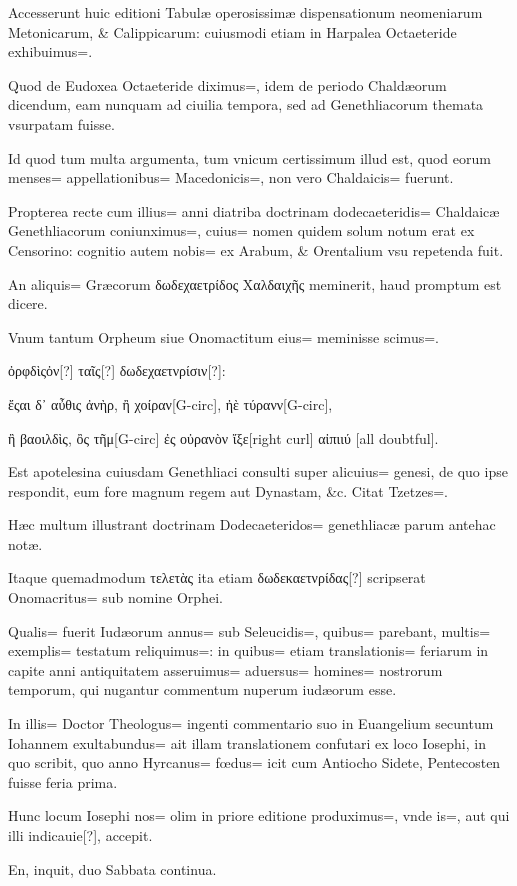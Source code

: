 \begin{parnumbers}
Accesserunt huic editioni Tabulæ operosissimæ dispensationum neomeniarum Metonicarum, \& Calippicarum: cuiusmodi etiam in Harpalea Octaeteride exhibuimus=. 

Quod de Eudoxea Octaeteride diximus=, idem de periodo Chaldæorum dicendum, eam nunquam ad ciuilia tempora, sed ad Genethliacorum themata vsurpatam fuisse.

Id quod tum multa argumenta, tum vnicum certissimum illud est, quod eorum menses= appellationibus= Macedonicis=, non vero Chaldaicis= fuerunt.

Propterea recte cum illius= anni diatriba doctrinam dodecaeteridis= Chaldaicæ Genethliacorum coniunximus=, cuius= nomen quidem solum notum erat ex Censorino: cognitio autem nobis= ex Arabum, \& Orentalium vsu repetenda fuit.

An aliquis= Græcorum δωδεχαετρίδος Χαλδαιχῆς meminerit, haud promptum est dicere.

Vnum tantum Orpheum siue Onomactitum eius= meminisse scimus=. 

ὀρφδὶςὀν[?] ταῖς[?] δωδεχαετνρίσιν[?]:

ἔςαι δ᾽ αὖθις ἀνὴρ, ἢ χοίραν[G-circ], ἠὲ τύρανν[G-circ],

ἢ βαοιλδὶς, ὂς τῆμ[G-circ] ἐς οὐρανὸν ἴξε[right curl] αἰπιιύ [all doubtful].

Est apotelesina cuiusdam Genethliaci consulti super alicuius= genesi, de quo ipse respondit, eum fore magnum regem aut Dynastam, \&c. Citat Tzetzes=. 

Hæc multum illustrant doctrinam Dodecaeteridos= genethliacæ parum antehac notæ.

Itaque quemadmodum τελετὰς ita etiam δωδεκαετνρίδας[?] scripserat Onomacritus= sub nomine Orphei.

Qualis= fuerit Iudæorum annus= sub Seleucidis=, quibus= parebant, multis= exemplis= testatum reliquimus=: in quibus= etiam translationis= feriarum in capite anni antiquitatem asseruimus= aduersus= homines= nostrorum temporum, qui nugantur commentum nuperum iudæorum esse.

In illis= Doctor Theologus= ingenti commentario suo in Euangelium secuntum Iohannem exultabundus= ait illam translationem confutari ex loco Iosephi, in quo scribit, quo anno Hyrcanus= fœdus= icit cum Antiocho Sidete, Pentecosten fuisse feria prima.

Hunc locum Iosephi nos= olim in priore editione produximus=, vnde is=, aut qui illi indicauie[?], accepit.

En, inquit, duo Sabbata continua.


\end{parnumbers}
